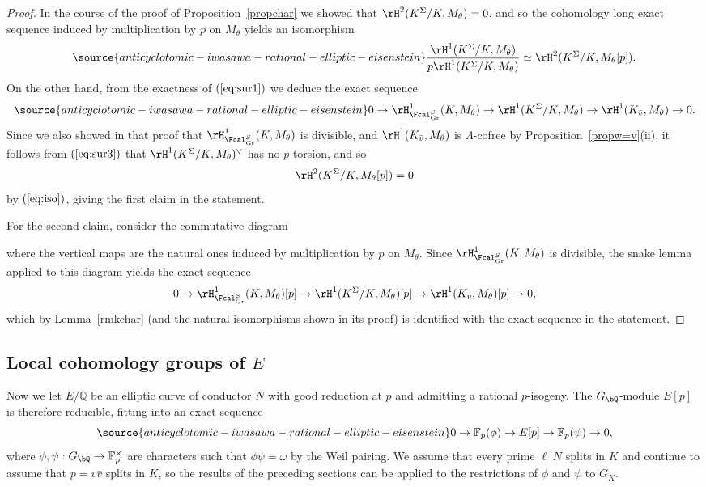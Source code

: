 \begin{proof}
In the course of the proof of Proposition~\ref{propchar} we showed that $\rH^2(K^\Sigma/K,M_\theta)=0$, and so the cohomology long exact sequence induced by multiplication by $p$ on $M_\theta$ yields an isomorphism
\begin{equation}\label{eq:iso}
\source{anticyclotomic-iwasawa-rational-elliptic-eisenstein}
\frac{\rH^1(K^\Sigma/K,M_\theta)}{p\rH^1(K^\Sigma/K,M_\theta)}\simeq\rH^2(K^\Sigma/K,M_\theta[p]).
\end{equation}
On the other hand, from the exactness of $(\ref{eq:sur1})$  we deduce the exact sequence
\begin{equation}\label{eq:sur3}
\source{anticyclotomic-iwasawa-rational-elliptic-eisenstein}
0\rightarrow\rH^1_{\Fcal_{\rm Gr}^S}(K,M_\theta)\rightarrow\rH^1(K^\Sigma/K,M_\theta)\rightarrow\rH^1(K_{\bar{v}},M_\theta)\rightarrow 0.
\end{equation}
Since we also showed in that proof that $\rH^1_{\Fcal_{\rm Gr}^S}(K,M_\theta)$ is divisible, and $\rH^1(K_{\bar{v}},M_\theta)$ is $\Lambda$-cofree by Proposition~\ref{propw=v}(ii), it follows from $(\ref{eq:sur3})$ that $\rH^1(K^\Sigma/K,M_\theta)^\vee$ has no $p$-torsion, and so
\[
\rH^2(K^\Sigma/K,M_\theta[p])=0
\]
by $(\ref{eq:iso})$, giving the first claim in the statement.

For the second claim, consider the commutative diagram


where the vertical maps are the natural ones induced by multiplication by $p$ on $M_\theta$. Since $\rH^1_{\Fcal_{\rm Gr}^S}(K,M_\theta)$ is divisible, the snake lemma applied to this diagram yields the exact sequence
\[
0\rightarrow\rH^1_{\Fcal_{\rm Gr}^S}(K,M_\theta)[p]\rightarrow\rH^1(K^\Sigma/K,M_\theta)[p]\rightarrow\rH^1(K_{\bar{v}},M_\theta)[p]\rightarrow 0,
\]
which by Lemma~\ref{rmkchar} (and the natural isomorphisms shown in its proof) is identified with the exact sequence in the statement.
\end{proof}


\subsection{Local cohomology groups of \texorpdfstring{$E$}{E}}
\label{subsec:local-E}

Now we let $E/\mathbb{Q}$ be an elliptic curve of conductor $N$ with good reduction at $p$ and admitting a rational $p$-isogeny. %
The $G_\bQ$-module $E[p]$ is therefore reducible, fitting into an exact sequence
\begin{equation}\label{eq:es-mod}
\source{anticyclotomic-iwasawa-rational-elliptic-eisenstein}
0\rightarrow\mathbb{F}_p(\phi)\rightarrow E[p]\rightarrow\mathbb{F}_p(\psi)\rightarrow 0,
\end{equation}
where $\phi,\psi:G_\bQ\rightarrow\mathbb{F}_p^\times$ are characters such that $\phi\psi=\omega$ by the Weil pairing. We assume that every prime $\ell\vert N$ splits in $K$ and continue to assume that $p=v\bar{v}$ splits in $K$, so the results of the preceding sections can be applied to the restrictions of $\phi$ and $\psi$ to $G_K$.

